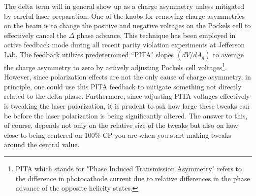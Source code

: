 \documentclass[12pt]{article}
\begin{document}
The delta term will in general show up as a charge asymmetry unless mitigated by careful laser preparation. One of the knobs for removing charge asymmetries on the beam is to change the positive and negative voltages on the Pockels cell to effectively cancel the $\Delta$ phase advance. This technique has been employed in active feedback mode during all recent parity violation experiments at Jefferson Lab. The feedback utilizes predetermined ``PITA" slopes $(dV/dA_q)$ to average the charge asymmetry to zero by actively adjusting Pockels cell voltages\footnote{PITA which stands for "Phase Induced Transmission Asymmetry" refers to the difference in photocathode current due to relative differences in the phase advance  of the opposite helicity states.}. However, since polarization effects are not the only cause of charge asymmetry, in principle, one could use this PITA feedback to mitigate something not directly related to the delta phase. Furthermore, since adjusting PITA voltages effectively is tweaking the laser polarization, it is prudent to ask how large these tweaks can be before the laser polarization is being significantly altered. The answer to this, of course, depends not only on the relative size of the tweaks but also on how close to being centered on 100\% CP you are when you start making tweaks around the central value. 
\end{document}
